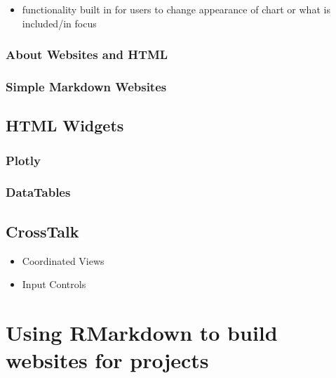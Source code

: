 \documentclass[
]{krantz}
\providecommand{\tightlist}{%
  \setlength{\itemsep}{0pt}\setlength{\parskip}{0pt}}
\begin{document}
\begin{itemize}
\tightlist
\item
  functionality built in for users to change appearance of chart or what is included/in focus
\end{itemize}

\hypertarget{about-websites-and-html}{%
\subsection{About Websites and HTML}\label{about-websites-and-html}}

\hypertarget{simple-markdown-websites}{%
\subsection{Simple Markdown Websites}\label{simple-markdown-websites}}

\hypertarget{html-widgets}{%
\section{HTML Widgets}\label{html-widgets}}

\hypertarget{plotly}{%
\subsection{Plotly}\label{plotly}}

\hypertarget{datatables}{%
\subsection{DataTables}\label{datatables}}

\hypertarget{crosstalk}{%
\section{CrossTalk}\label{crosstalk}}

\begin{itemize}
\tightlist
\item
  Coordinated Views
\item
  Input Controls
\end{itemize}

\hypertarget{rmarkdown-websites}{%
\chapter{Using RMarkdown to build websites for projects}\label{rmarkdown-websites}}
\end{document}
